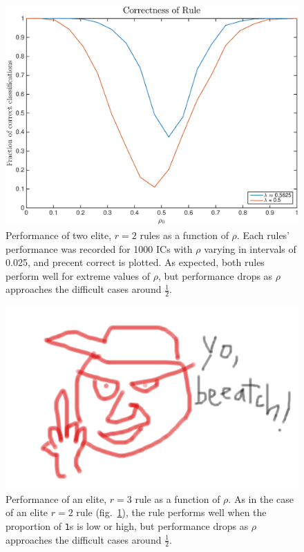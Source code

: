 \begin{figure}
\begin{center}
\includegraphics[width=\linewidth]{figures/lambda_correctness_1_r2.eps}
\caption{Performance of two elite, $r = 2$ rules as a function of $\rho$. Each rules' performance was recorded for 1000 ICs with $\rho$ 
varying in intervals of 0.025, and precent correct is plotted. As expected, both rules perform well for extreme values of $\rho$, but 
performance drops as $\rho$ approaches the difficult cases around $\frac{1}{2}$.}
\label{fig:r2_rho}
\end{center}
\end{figure}
\begin{figure} [ht]
\begin{center}
\includegraphics[width=\linewidth]{foo.png}
\caption{Performance of an elite, $r = 3$ rule as a function of $\rho$. As in the case of an elite $r = 2$ rule (fig.~\ref{fig:r2_rho}), the rule performs well when the proportion of \texttt{1}s is 
low or high, but performance drops as $\rho$ approaches the difficult cases around $\frac{1}{2}$.}
\label{fig:r3_rho}
\end{center}
\end{figure}

